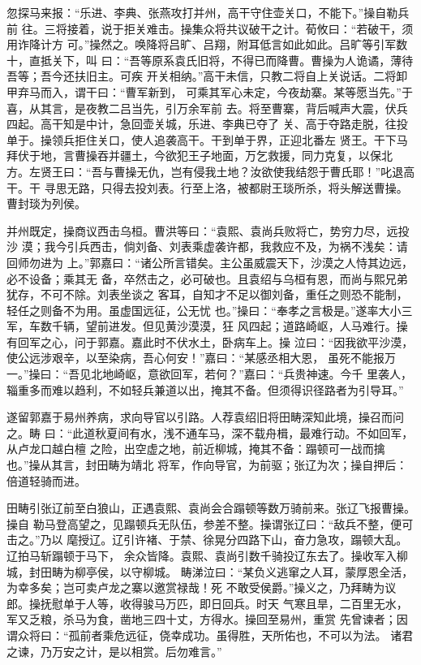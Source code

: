忽探马来报：“乐进、李典、张燕攻打并州，高干守住壶关口，不能下。”操自勒兵前
往。三将接着，说于拒关难击。操集众将共议破干之计。荀攸曰：“若破干，须用诈降计方
可。”操然之。唤降将吕旷、吕翔，附耳低言如此如此。吕旷等引军数十，直抵关下，叫
曰：“吾等原系袁氏旧将，不得已而降曹。曹操为人诡谲，薄待吾等；吾今还扶旧主。可疾
开关相纳。”高干未信，只教二将自上关说话。二将卸甲弃马而入，谓干曰：“曹军新到，
可乘其军心未定，今夜劫寨。某等愿当先。”于喜，从其言，是夜教二吕当先，引万余军前
去。将至曹寨，背后喊声大震，伏兵四起。高干知是中计，急回壶关城，乐进、李典已夺了
关、高于夺路走脱，往投单于。操领兵拒住关口，使人追袭高干。干到单于界，正迎北番左
贤王。干下马拜伏于地，言曹操吞并疆土，今欲犯王子地面，万乞救援，同力克复，以保北
方。左贤王曰：“吾与曹操无仇，岂有侵我土地？汝欲使我结怨于曹氏耶！”叱退高干。干
寻思无路，只得去投刘表。行至上洛，被都尉王琰所杀，将头解送曹操。曹封琰为列侯。

并州既定，操商议西击乌桓。曹洪等曰：“袁熙、袁尚兵败将亡，势穷力尽，远投沙
漠；我今引兵西击，倘刘备、刘表乘虚袭许都，我救应不及，为祸不浅矣：请回师勿进为
上。”郭嘉曰：“诸公所言错矣。主公虽威震天下，沙漠之人恃其边远，必不设备；乘其无
备，卒然击之，必可破也。且袁绍与乌桓有恩，而尚与熙兄弟犹存，不可不除。刘表坐谈之
客耳，自知才不足以御刘备，重任之则恐不能制，轻任之则备不为用。虽虚国远征，公无忧
也。”操曰：“奉孝之言极是。”遂率大小三军，车数千辆，望前进发。但见黄沙漠漠，狂
风四起；道路崎岖，人马难行。操有回军之心，问于郭嘉。嘉此时不伏水土，卧病车上。操
泣曰：“因我欲平沙漠，使公远涉艰辛，以至染病，吾心何安！”嘉曰：“某感丞相大恩，
虽死不能报万一。”操曰：“吾见北地崎岖，意欲回军，若何？”嘉曰：“兵贵神速。今千
里袭人，辎重多而难以趋利，不如轻兵兼道以出，掩其不备。但须得识径路者为引导耳。”

遂留郭嘉于易州养病，求向导官以引路。人荐袁绍旧将田畴深知此境，操召而问之。畴
曰：“此道秋夏间有水，浅不通车马，深不载舟楫，最难行动。不如回军，从卢龙口越白檀
之险，出空虚之地，前近柳城，掩其不备：蹋顿可一战而擒也。”操从其言，封田畴为靖北
将军，作向导官，为前驱；张辽为次；操自押后：倍道轻骑而进。

田畴引张辽前至白狼山，正遇袁熙、袁尚会合蹋顿等数万骑前来。张辽飞报曹操。操自
勒马登高望之，见蹋顿兵无队伍，参差不整。操谓张辽曰：“敌兵不整，便可击之。”乃以
麾授辽。辽引许褚、于禁、徐晃分四路下山，奋力急攻，蹋顿大乱。辽拍马斩蹋顿于马下，
余众皆降。袁熙、袁尚引数千骑投辽东去了。操收军入柳城，封田畴为柳亭侯，以守柳城。
畴涕泣曰：“某负义逃窜之人耳，蒙厚恩全活，为幸多矣；岂可卖卢龙之寨以邀赏禄哉！死
不敢受侯爵。”操义之，乃拜畴为议郎。操抚慰单于人等，收得骏马万匹，即日回兵。时天
气寒且旱，二百里无水，军又乏粮，杀马为食，凿地三四十丈，方得水。操回至易州，重赏
先曾谏者；因谓众将曰：“孤前者乘危远征，侥幸成功。虽得胜，天所佑也，不可以为法。
诸君之谏，乃万安之计，是以相赏。后勿难言。”

